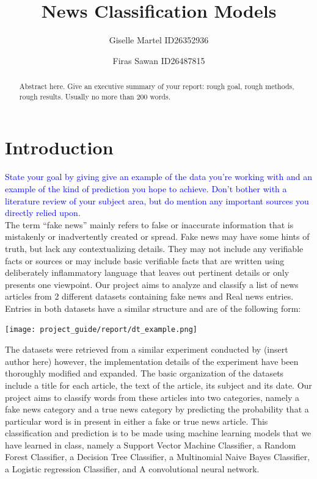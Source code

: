 \documentclass[10pt,twocolumn,letterpaper]{article}
\begin{document}
\title{News Classification Models}
\author{Giselle Martel ID26352936 \and Firas Sawan ID26487815}
\maketitle

\begin{abstract}
   Abstract here. Give an executive summary of your report: rough goal, rough methods, rough results. Usually no more than 200 words.
\end{abstract}

\section{Introduction}
\textcolor{blue}{State your goal by giving give an example of the data you're working with and an example of the kind of prediction you hope to achieve. Don't bother with a literature review of your subject area, but do mention any important sources you directly relied upon.}\\

The term “fake news” mainly refers to false or inaccurate information that is mistakenly or inadvertently created or spread. Fake news may have some hints of truth, but lack any contextualizing details. They may not include any verifiable facts or sources or may include basic verifiable facts that are written using deliberately inflammatory language that leaves out pertinent details or only presents one viewpoint. Our project aims to analyze and classify a list of news articles from 2 different datasets containing fake news and Real news entries. Entries in both datasets have a similar structure and are of the following form:   

\begin{center}
\texttt{[image: project\_guide/report/dt\_example.png]}
\end{center}

The datasets were retrieved from a similar experiment conducted by (insert author here) however, the implementation details of the experiment have been thoroughly modified and expanded. The basic organization of the datasets include a title for each article, the text of the article, its subject and its date. Our project aims to classify words from these articles into two categories, namely a fake news category and a true news category by predicting the probability that a particular word is in present in either a fake or true news article. This classification and prediction is to be made using machine learning models that we have learned in class, namely a Support Vector Machine Classifier, a Random Forest Classifier, a Decision Tree Classifier, a Multinomial Naive Bayes Classifier, a Logistic regression Classifier, and A convolutional neural network. \\
\end{document}
